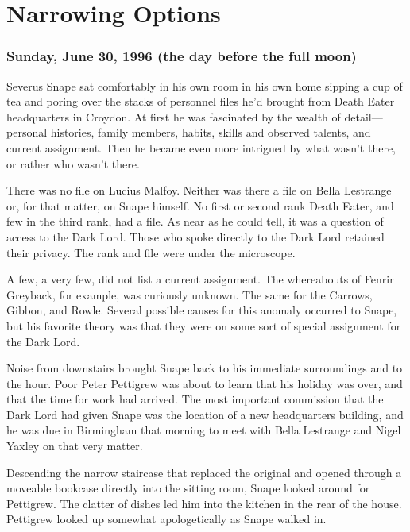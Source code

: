 
\chapter{Narrowing Options}

\subsection{Sunday, June 30, 1996 (the day before the full moon)}

Severus Snape sat comfortably in his own room in his own home sipping a cup of tea and poring over the stacks of personnel files he'd brought from Death Eater headquarters in Croydon. At first he was fascinated by the wealth of detail—personal histories, family members, habits, skills and observed talents, and current assignment. Then he became even more intrigued by what wasn't there, or rather who wasn't there.

There was no file on Lucius Malfoy. Neither was there a file on Bella Lestrange or, for that matter, on Snape himself. No first or second rank Death Eater, and few in the third rank, had a file. As near as he could tell, it was a question of access to the Dark Lord. Those who spoke directly to the Dark Lord retained their privacy. The rank and file were under the microscope.

A few, a very few, did not list a current assignment. The whereabouts of Fenrir Greyback, for example, was curiously unknown. The same for the Carrows, Gibbon, and Rowle. Several possible causes for this anomaly occurred to Snape, but his favorite theory was that they were on some sort of special assignment for the Dark Lord.

Noise from downstairs brought Snape back to his immediate surroundings and to the hour. Poor Peter Pettigrew was about to learn that his holiday was over, and that the time for work had arrived. The most important commission that the Dark Lord had given Snape was the location of a new headquarters building, and he was due in Birmingham that morning to meet with Bella Lestrange and Nigel Yaxley on that very matter.

Descending the narrow staircase that replaced the original and opened through a moveable bookcase directly into the sitting room, Snape looked around for Pettigrew. The clatter of dishes led him into the kitchen in the rear of the house. Pettigrew looked up somewhat apologetically as Snape walked in.

